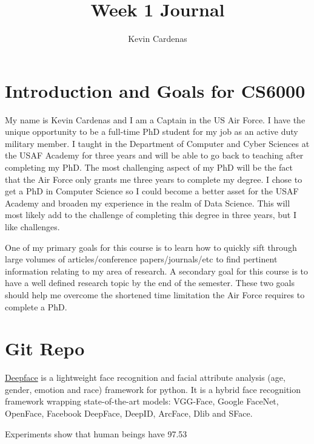\title{Week 1 Journal}
\author{Kevin Cardenas}

%
\maketitle

\section{Introduction and Goals for CS6000}

My name is Kevin Cardenas and I am a Captain in the US Air Force. I have the unique opportunity to be a full-time PhD student for my job as an active duty military member. I taught in the Department of Computer and Cyber Sciences at the USAF Academy for three years and will be able to go back to teaching after completing my PhD. The most challenging aspect of my PhD will be the fact that the Air Force only grants me three years to complete my degree. I chose to get a PhD in Computer Science so I could become a better asset for the USAF Academy and broaden my experience in the realm of Data Science. This will most likely add to the challenge of completing this degree in three years, but I like challenges. 

One of my primary goals for this course is to learn how to quickly sift through large volumes of articles/conference papers/journals/etc to find pertinent information relating to my area of research. A secondary goal for this course is to have a well defined research topic by the end of the semester. These two goals should help me overcome the shortened time limitation the Air Force requires to complete a PhD.

\section{Git Repo}
    \href{https://github.com/serengil/deepface}{Deepface} is a lightweight face recognition and facial attribute analysis (age, gender, emotion and race) framework for python. It is a hybrid face recognition framework wrapping state-of-the-art models: VGG-Face, Google FaceNet, OpenFace, Facebook DeepFace, DeepID, ArcFace, Dlib and SFace.

Experiments show that human beings have 97.53%

